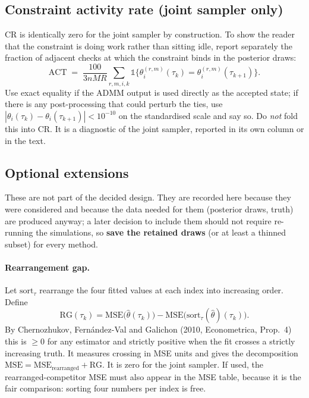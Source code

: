 \documentclass[11pt]{article}
\newcommand{\ind}{\mathbb{1}}
\begin{document}
\subsection{Constraint activity rate (joint sampler only)}
\label{sec:activity}

CR is identically zero for the joint sampler by construction. To show the reader that the constraint is doing work rather than sitting idle, report separately the fraction of adjacent checks at which the constraint binds in the posterior draws:
\begin{equation}
\mathrm{ACT} \;=\; \frac{100}{3nMR}\sum_{r,m,i,k}\ind\bigl\{\theta^{(r,m)}_i(\tau_k) = \theta^{(r,m)}_i(\tau_{k+1})\bigr\}.
\label{eq:act}
\end{equation}
Use exact equality if the ADMM output is used directly as the accepted state; if there is any post-processing that could perturb the ties, use $|\theta_i(\tau_k)-\theta_i(\tau_{k+1})|<10^{-10}$ on the standardised scale and say so. Do \emph{not} fold this into CR. It is a diagnostic of the joint sampler, reported in its own column or in the text.

\subsection{Optional extensions}
\label{sec:optional}

These are not part of the decided design. They are recorded here because they were considered and because the data needed for them (posterior draws, truth) are produced anyway; a later decision to include them should not require re-running the simulations, so \textbf{save the retained draws} (or at least a thinned subset) for every method.

\paragraph{Rearrangement gap.} Let $\mathrm{sort}_\tau$ rearrange the four fitted values at each index into increasing order. Define
\[
\mathrm{RG}(\tau_k) = \mathrm{MSE}\bigl(\hat\theta(\tau_k)\bigr) - \mathrm{MSE}\bigl(\mathrm{sort}_\tau(\hat\theta)(\tau_k)\bigr).
\]
By Chernozhukov, Fern\'andez-Val and Galichon (2010, Econometrica, Prop.~4) this is $\ge 0$ for any estimator and strictly positive when the fit crosses a strictly increasing truth. It measures crossing in MSE units and gives the decomposition $\mathrm{MSE}=\mathrm{MSE}_{\text{rearranged}}+\mathrm{RG}$. It is zero for the joint sampler. If used, the rearranged-competitor MSE must also appear in the MSE table, because it is the fair comparison: sorting four numbers per index is free.
\end{document}

